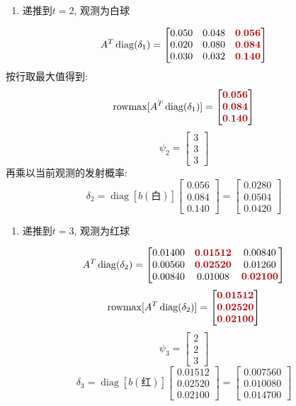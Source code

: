 \begin{enumerate}
\item[2.] 递推到$t=2$, 观测为白球
\end{enumerate}
\[
A^T \operatorname{diag}(\delta_1)
    =
    \begin{bmatrix}
    0.050 & 0.048 & \viterbimax{0.056} \\
    0.020 & 0.080 & \viterbimax{0.084} \\
    0.030 & 0.032 & \viterbimax{0.140}
    \end{bmatrix}
\]
按行取最大值得到:
\[
\operatorname{rowmax}[A^T \operatorname{diag}(\delta_1)]
    = \begin{bmatrix}\viterbimax{0.056} \\ \viterbimax{0.084} \\ \viterbimax{0.140}\end{bmatrix}
\]
\[
\psi_2 = \begin{bmatrix}3 \\ 3 \\ 3\end{bmatrix}
\]
再乘以当前观测的发射概率:
\[
\delta_2
    = \operatorname{diag}[b(\text{白})] \begin{bmatrix}0.056 \\ 0.084 \\ 0.140\end{bmatrix}
    = \begin{bmatrix}0.0280 \\ 0.0504 \\ 0.0420\end{bmatrix}
\]

\begin{enumerate}
\item[3.] 递推到$t=3$, 观测为红球
\end{enumerate}
\[
A^T \operatorname{diag}(\delta_2)
    =
    \begin{bmatrix}
    0.01400 & \viterbimax{0.01512} & 0.00840 \\
    0.00560 & \viterbimax{0.02520} & 0.01260 \\
    0.00840 & 0.01008 & \viterbimax{0.02100}
    \end{bmatrix}
\]
\[
\operatorname{rowmax}[A^T \operatorname{diag}(\delta_2)]
    = \begin{bmatrix}\viterbimax{0.01512} \\ \viterbimax{0.02520} \\ \viterbimax{0.02100}\end{bmatrix}
\]
\[
\psi_3 = \begin{bmatrix}2 \\ 2 \\ 3\end{bmatrix}
\]
\[
\delta_3
    = \operatorname{diag}[b(\text{红})] \begin{bmatrix}0.01512 \\ 0.02520 \\ 0.02100\end{bmatrix}
    = \begin{bmatrix}0.007560 \\ 0.010080 \\ 0.014700\end{bmatrix}
\]

